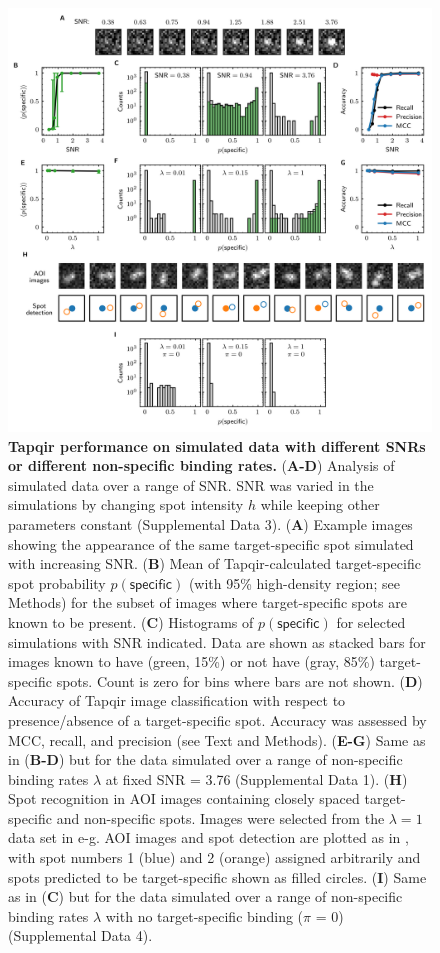 \begin{figure}
\begin{fullwidth}
\includegraphics[width=183mm]{figures/tapqir_performance.png}
\caption{\textbf{Tapqir performance on simulated data with different SNRs or different non-specific binding rates.} (\textbf{A-D}) Analysis of simulated data over a range of SNR. SNR was varied in the simulations by changing spot intensity  $h$ while keeping other parameters constant (Supplemental Data 3). (\textbf{A}) Example images showing the appearance of the same target-specific spot simulated with increasing SNR.   (\textbf{B}) Mean of Tapqir-calculated target-specific spot probability $p(\mathsf{specific})$ (with 95\% high-density region; see Methods) for the subset of images where target-specific spots  are known to be present. (\textbf{C}) Histograms of $p(\mathsf{specific})$ for selected simulations with SNR indicated. Data are shown as stacked bars for images known to have (green, 15\%) or not have (gray, 85\%) target-specific spots.  Count is zero for bins where bars are not shown. (\textbf{D}) Accuracy of Tapqir image classification with respect to presence/absence of a target-specific spot. Accuracy was assessed by MCC, recall, and precision (see Text and Methods). (\textbf{E-G}) Same as in (\textbf{B-D}) but for the data simulated over a range of non-specific binding rates $\lambda$ at fixed SNR = 3.76 (Supplemental Data 1). (\textbf{H}) Spot recognition in AOI images containing closely spaced target-specific and non-specific spots.  Images were selected from the $\lambda = 1$ data set in e-g. AOI images and spot detection are plotted as in , with spot numbers 1 (blue) and 2 (orange) assigned arbitrarily and spots predicted to be target-specific shown as filled circles. (\textbf{I}) Same as in (\textbf{C}) but for the data simulated over a range of non-specific binding rates $\lambda$ with no target-specific binding ($\pi$ = 0) (Supplemental Data 4).}

\end{fullwidth}
\end{figure}
